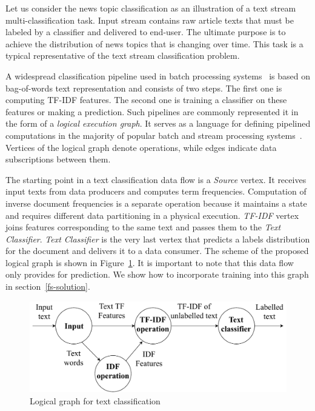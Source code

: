 \label{fs-framework}

Let us consider the news topic classification as an illustration of a text stream multi-classification task. Input stream contains raw article texts that must be labeled by a classifier and delivered to end-user. The ultimate purpose is to achieve the distribution of news topics that is changing over time. This task is a typical representative of the text stream classification problem.

A widespread classification pipeline used in batch processing systems~\cite{semberecki2016distributed} is based on bag-of-words text representation and consists of two steps. The first one is computing TF-IDF features. The second one is training a classifier on these features or making a prediction. Such pipelines are commonly represented it in the form of a {\em logical execution graph}. It serves as a language for defining pipelined computations in the majority of popular batch and stream processing systems~\cite{Carbone:2017:SMA:3137765.3137777, Zaharia:2016:ASU:3013530.2934664, apache:storm, Kulkarni:2015:THS:2723372.2742788, Noghabi:2017:SSS:3137765.3137770}. Vertices of the logical graph denote operations, while edges indicate data subscriptions between them. 

The starting point in a text classification data flow is a {\em Source} vertex. It receives input texts from data producers and computes term frequencies. Computation of inverse document frequencies is a separate operation because it maintains a state and requires different data partitioning in a physical execution. {\em TF-IDF} vertex joins features corresponding to the same text and passes them to the {\em Text Classifier}. {\em Text Classifier} is the very last vertex that predicts a labels distribution for the document and delivers it to a data consumer. The scheme of the proposed logical graph is shown in Figure~\ref{logical_graph}. It is important to note that this data flow only provides for prediction. 
We show how to incorporate training into this graph in section~\ref{fs-solution}.


\begin{figure}[htbp]
  \centering
  \includegraphics[scale=0.39]{pics/logical-graph-no-part-fit}
  \caption{Logical graph for text classification}
  \label {logical_graph}
\end{figure}

